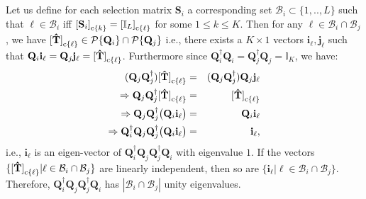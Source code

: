 \documentclass[journal,comsoc]{IEEEtran}
\begin{document}
\begin{appendices}
\section{} \label{appdix4}
Let us define for each selection matrix $\mathbf{S}_i$ a corresponding set $\mathcal{B}_i \subset \{1,..,L\}$ such that $\ell \in \mathcal{B}_i$ iff ${[\mathbf{S}_i]}_{{\rm c}\{k\}} = {[\mathbb{I}_L]}_{{\rm c}\{\ell\}}$ for some $1 \leq k \leq K$. Then for any $\ell \in \mathcal{B}_i \cap \mathcal{B}_j$, we have ${[\mathbf{\hat{T}}]}_{{\rm c}\{\ell\}} \in \mathcal{P}\{\mathbf{Q}_i\} \cap \mathcal{P}\{\mathbf{Q}_j\}$ i.e., there exists a $K\times 1$ vectors $\mathbf{i}_{\ell}, \mathbf{j}_{\ell}$ such that $\mathbf{Q}_i \mathbf{i}_{\ell} = \mathbf{Q}_j \mathbf{j}_{\ell} = {[\mathbf{\hat{T}}]}_{{\rm c}\{\ell\}}$. Furthermore since $\mathbf{Q}_i^{\dag} \mathbf{Q}_i = \mathbf{Q}_j^{\dag} \mathbf{Q}_j = \mathbb{I}_K$, we have:
\begin{eqnarray}
(\mathbf{Q}_j \mathbf{Q}_j^{\dag}) {[\mathbf{\hat{T}}]}_{{\rm c}\{\ell\}} &=& (\mathbf{Q}_j \mathbf{Q}_j^{\dag} ) \mathbf{Q}_j \mathbf{j}_{\ell} \nonumber \\
\Rightarrow \mathbf{Q}_j \mathbf{Q}^{\dag}_j {[\mathbf{\hat{T}}]}_{{\rm c}\{\ell\}} &=& {[\mathbf{\hat{T}}]}_{{\rm c}\{\ell\}} \nonumber \\
\Rightarrow \mathbf{Q}_j \mathbf{Q}^{\dag}_j \big( \mathbf{Q}_i \mathbf{i}_{\ell} \big) &=& \mathbf{Q}_i \mathbf{i}_{\ell} \nonumber \\
\Rightarrow \mathbf{Q}_i^{\dag} \mathbf{Q}_j \mathbf{Q}^{\dag}_j \big( \mathbf{Q}_i \mathbf{i}_{\ell} \big) &=& \mathbf{i}_{\ell}, \nonumber
\end{eqnarray}
i.e., $\mathbf{i}_{\ell}$ is an eigen-vector of $\mathbf{Q}^{\dag}_i \mathbf{Q}_j \mathbf{Q}^{\dag}_j \mathbf{Q}_i$ with eigenvalue $1$. If the vectors $\{{[\mathbf{\hat{T}}]}_{{\rm c}\{\ell\}} | \ell \in \mathcal{B}_i \cap \mathcal{B}_j\} $ are linearly independent, then so are $\{\mathbf{i}_{\ell} | \ell \in \mathcal{B}_i \cap \mathcal{B}_j\}$. Therefore, $\mathbf{Q}^{\dag}_i \mathbf{Q}_j \mathbf{Q}^{\dag}_j \mathbf{Q}_i$ has $|\mathcal{B}_i \cap \mathcal{B}_j|$ unity eigenvalues.
\end{appendices}




\end{document}
